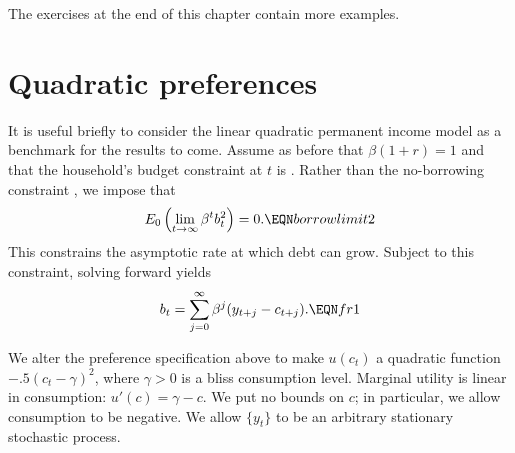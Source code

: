 The exercises at the end of this chapter contain more
examples.

\section{Quadratic preferences}

It is useful briefly to consider the linear quadratic permanent
income model as a benchmark for the results to come.  Assume as
before that $\beta(1+r)=1$ and that the household's budget
constraint at $t$ is . Rather than the no-borrowing
constraint , we impose that
 $$E_0\left( \lim_{t\rightarrow \infty}
 \beta^t b_t^2   \right)
= 0. \EQN borrowlimit2 $$  This constrains
the asymptotic rate at which debt can grow.
Subject to this constraint, solving 
forward yields
$$ b_t = \sum_{j=0}^\infty \beta^j (y_{t+j} - c_{t+j}).
\EQN fr1 $$

 We alter the preference specification
above to make $u(c_t) $ a quadratic function
$-.5 (c_t - \gamma)^2$, where $\gamma >0$ is a bliss
consumption level. Marginal utility is
linear in consumption: $u'(c) = \gamma - c$.
We put no bounds on $c$; in particular, we allow
consumption to be negative.  We allow $\{y_t\}$
to be an arbitrary stationary stochastic process.

